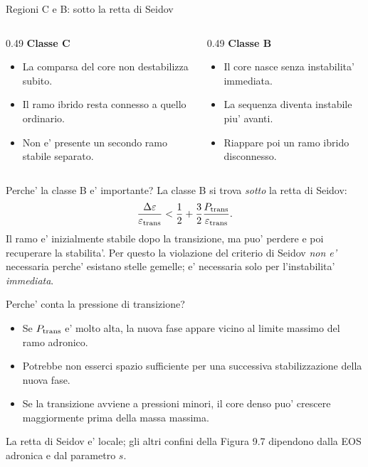 \begin{frame}{Regioni C e B: sotto la retta di Seidov}
\small
\begin{columns}[T,onlytextwidth]
\begin{column}{0.49\textwidth}
\textbf{Classe C}
\begin{itemize}
\item La comparsa del core non destabilizza subito.
\item Il ramo ibrido resta connesso a quello ordinario.
\item Non e' presente un secondo ramo stabile separato.
\end{itemize}
\end{column}
\begin{column}{0.49\textwidth}
\textbf{Classe B}
\begin{itemize}
\item Il core nasce senza instabilita' immediata.
\item La sequenza diventa instabile piu' avanti.
\item Riappare poi un ramo ibrido disconnesso.
\end{itemize}
\end{column}
\end{columns}
\end{frame}

\begin{frame}{Perche' la classe B e' importante?}
\small
La classe B si trova \emph{sotto} la retta di Seidov:
\[
\frac{\Delta\varepsilon}{\varepsilon_{\rm trans}}
<\frac12+\frac32\frac{P_{\rm trans}}{\varepsilon_{\rm trans}}.
\]
Il ramo e' inizialmente stabile dopo la transizione,
ma puo' perdere e poi recuperare la stabilita'.
\medskip
Per questo la violazione del criterio di Seidov \emph{non e'}
necessaria perche' esistano stelle gemelle;
e' necessaria solo per l'instabilita' \emph{immediata}.
\end{frame}

\begin{frame}{Perche' conta la pressione di transizione?}
\small
\begin{itemize}
\item Se $P_{\rm trans}$ e' molto alta, la nuova fase appare
vicino al limite massimo del ramo adronico.
\item Potrebbe non esserci spazio sufficiente per una successiva
stabilizzazione della nuova fase.
\item Se la transizione avviene a pressioni minori, il core denso
puo' crescere maggiormente prima della massa massima.
\end{itemize}
\medskip
La retta di Seidov e' locale; gli altri confini della
Figura 9.7 dipendono dalla EOS adronica e dal parametro $s$.
\end{frame}

